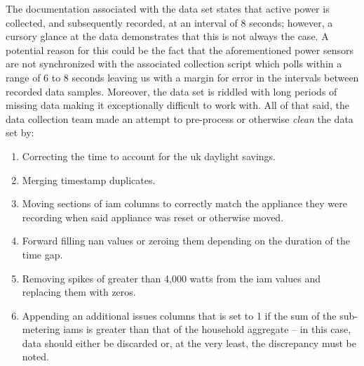 \noindent \newline The documentation associated with the data set states that active power is collected, and subsequently recorded, at an interval of 8 seconds; however, a cursory glance at the data demonstrates that this is not always the case. A potential reason for this could be the fact that the aforementioned power sensors are not synchronized with the associated collection script which polls within a range of 6 to 8 seconds leaving us with a margin for error in the intervals between recorded data samples. Moreover, the data set is riddled with long periods of missing data making it exceptionally difficult to work with. All of that said, the data collection team made an attempt to pre-process or otherwise \textit{clean} the data set by:

\begin{enumerate}
    \item Correcting the time to account for the \gls{uk} daylight savings.
    \item Merging timestamp duplicates.
    \item Moving sections of \gls{iam} columns to correctly match the appliance they were recording when said appliance was reset or otherwise moved.
    \item Forward filling \gls{nan} values or zeroing them depending on the duration of the time gap.
    \item Removing spikes of greater than 4,000 watts from the \gls{iam} values and replacing them with zeros.
    \item Appending an additional issues columns that is set to 1 if the sum of the sub-metering \glspl{iam} is greater than that of the household aggregate -- in this case, data should either be discarded or, at the very least, the discrepancy must be noted.
\end{enumerate}

